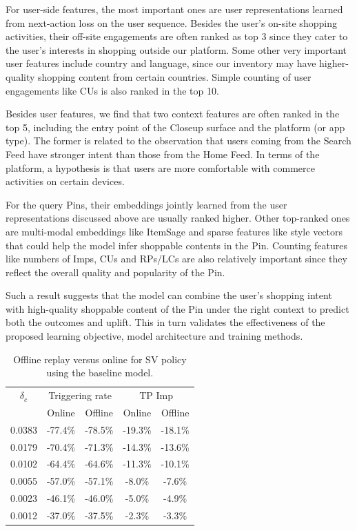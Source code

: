 \documentclass[sigconf, authorversion]{acmart}
\begin{document}
For user-side features, the most important ones are user representations learned from next-action loss on the user sequence. Besides the user's on-site shopping activities, their off-site engagements are often ranked as top 3 since they cater to the user's interests in shopping outside our platform. Some other very important user features include country and language, since our inventory may have higher-quality shopping content from certain countries. Simple counting of user engagements like CUs is also ranked in the top 10.

Besides user features, we find that two context features are often ranked in the top 5, including the entry point of the Closeup surface and the platform (or app type). The former is related to the observation that users coming from the Search Feed have stronger intent than those from the Home Feed. In terms of the platform, a hypothesis is that users are more comfortable with commerce activities on certain devices.

For the query Pins, their embeddings jointly learned from the user representations discussed above are usually ranked higher. Other top-ranked ones are multi-modal embeddings like ItemSage \cite{PinsItemSage} and sparse features like style vectors that could help the model infer shoppable contents in the Pin. Counting features like numbers of Imps, CUs and RPs/LCs are also relatively important since they reflect the overall quality and popularity of the Pin.

Such a result suggests that the model can combine the user's shopping intent with high-quality shoppable content of the Pin under the right context to predict both the outcomes and uplift. This in turn validates the effectiveness of the proposed learning objective, model architecture and training methods.

\begin{table}[h]
  \caption{Offline replay versus online for SV policy using the baseline model.}
  \label{tab:single_value_offline_online}
  \begin{tabular}{ccccc}
    \toprule
    $\delta_c$ & \multicolumn{2}{c}{Triggering rate} & \multicolumn{2}{c}{TP Imp} \\
    & Online & Offline & Online & Offline \\
    \hline
    0.0383 & -77.4\% & -78.5\% & -19.3\% & -18.1\%  \\
    0.0179 & -70.4\% & -71.3\% & -14.3\% & -13.6\% \\
    0.0102 & -64.4\% & -64.6\% & -11.3\% & -10.1\% \\
    0.0055 & -57.0\% & -57.1\% & -8.0\% & -7.6\% \\
    0.0023 & -46.1\% & -46.0\% & -5.0\% & -4.9\% \\
    0.0012 & -37.0\% & -37.5\% & -2.3\% & -3.3\% \\
    \bottomrule
  \end{tabular}
\end{table}
\end{document}

